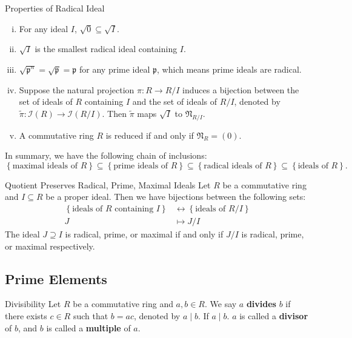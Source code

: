 \begin{proposition}{Properties of Radical Ideal}{}
    \begin{enumerate}[(i)]
        \item For any ideal $I$, $\sqrt{0}\subseteq \sqrt{I}$.
        \item $\sqrt{I}$ is the smallest radical ideal containing $I$.
        \item $\sqrt{\mathfrak{p}^n}=\sqrt{\mathfrak{p}}=\mathfrak{p}$ for any prime ideal $\mathfrak{p}$, which means prime ideals are radical.
        \item Suppose the natural projection $\pi: R\to R/I$ induces a bijection between the set of ideals of $R$ containing $I$ and the set of ideals of $R/I$, denoted by $\tilde{\pi}:\mathcal{I}(R)\to\mathcal{I}(R/I)$. Then $\tilde{\pi}$ maps $\sqrt{I}$ to $\mathfrak{N}_{R/I}$.
        \item A commutative ring $R$ is reduced if and only if $\mathfrak{N}_R=(0)$. 
    \end{enumerate}
\end{proposition}

In summary, we have the following chain of inclusions:
\[
\left\{\text{maximal ideals of }R\right\} \subseteq \left\{\text{prime ideals of }R\right\} \subseteq \left\{\text{radical ideals of }R\right\} \subseteq \left\{\text{ideals of }R\right\}.
\]
\begin{proposition}{Quotient Preserves Radical, Prime, Maximal Ideals}{}
    Let $R$ be a commutative ring and $I\subseteq R$ be a proper ideal. Then we have bijections between the following sets:
    \begin{align*}
        \left\{\text{ideals of }R\text{ containing }I\right\}&\longleftrightarrow\left\{\text{ideals of }R/I\right\}\\
        J&\longmapsto J/I
    \end{align*}
    The ideal $J\supseteq I$ is radical, prime, or maximal if and only if $J/I$ is radical, prime, or maximal respectively.
\end{proposition}


\subsection{Prime Elements}
\begin{definition}{Divisibility}{}
    Let $R$ be a commutative ring and $a,b\in R$. We say $a$ \textbf{divides} $b$ if there exists $c\in R$ such that $b=ac$, denoted by $a\mid b$. If $a\mid b$. $a$ is called a \textbf{divisor} of $b$, and $b$ is called a \textbf{multiple} of $a$.
\end{definition}



